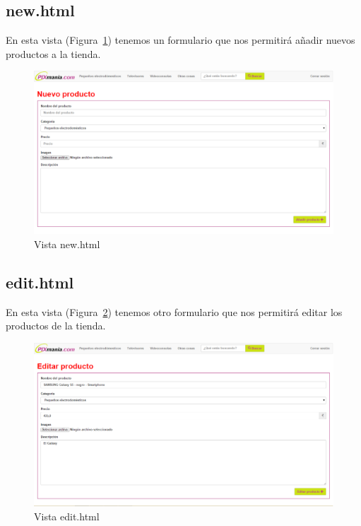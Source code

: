 \documentclass[12pt,a4paper,svgnames]{article}
\begin{document}
\subsection{new.html}
En esta vista (Figura~\ref{fig:new}) tenemos un formulario que nos permitirá añadir nuevos productos a la tienda.

\begin{figure}[htbp]
	\centering
	\includegraphics[width=1\linewidth]{imagenes/new}
	\caption{Vista new.html}
	\label{fig:new}
\end{figure}

\subsection{edit.html}
En esta vista (Figura~\ref{fig:edit}) tenemos otro formulario que nos permitirá editar los productos de la tienda.

\begin{figure}[htbp]
	\centering
	\includegraphics[width=1\linewidth]{imagenes/edit}
	\caption{Vista edit.html}
	\label{fig:edit}
\end{figure}
\end{document}
